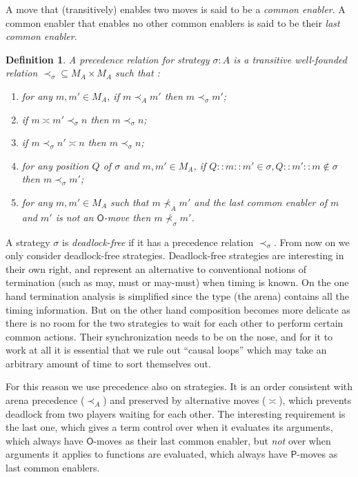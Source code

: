 \documentclass{article}
\newtheorem{definition}[theorem]{Definition}
\newcommand{\mv}[1]{\mathsf{#1}}
\begin{document}
A move that (transitively) enables two moves is said to be a \emph{common enabler}. A common enabler that enables no other common enablers is said to be their \emph{last common enabler}. 
\begin{definition}\label{def:precs}
A \emph{precedence relation for strategy} $\sigma:A$ is a transitive well-founded relation ${\prec_\sigma}\subseteq M_A\times M_A$ such that :
\begin{enumerate}
\item for any $m,m'\in M_A$, if $m\prec_A m'$ then $m\prec_\sigma m'$;
\item if $m\asymp m' \prec_\sigma n$ then $m\prec_\sigma n$;
\item if $m\prec_\sigma n'\asymp n$ then $m\prec_\sigma n$;
\item for any position $Q$ of $\sigma$ and $m,m'\in M_A$, if $Q::m::m'\in \sigma, Q::m'::m\not\in\sigma$ then $m\prec_\sigma m'$;
\item for any $m,m'\in M_A$ such that $m\not\prec_A m'$ and the last common enabler of $m$ and $m'$ is not an $\mv O$-move then $m\not\prec_\sigma m'$.
\end{enumerate}
\end{definition}
A strategy $\sigma$ is \emph{deadlock-free} if it has a precedence relation $\prec_\sigma$. From now on we only consider deadlock-free strategies. Deadlock-free strategies are interesting in their own right, and represent an alternative to conventional notions of termination (such as may, must or may-must) when timing is known. On the one hand termination analysis is simplified since the type (the arena) contains all the timing information. But on the other hand composition becomes more delicate as there is no room for the two strategies to wait for each other to perform certain common actions. Their synchronization needs to be on the nose, and for it to work at all it is essential that we rule out ``causal loops'' which may take an arbitrary amount of time to sort themselves out.  

For this reason we use precedence also on strategies. It is an order consistent with arena precedence ($\prec_A$) and preserved by alternative moves ($\asymp$), which prevents deadlock from two players waiting for each other.  The interesting requirement is the last one, which gives a term control over when it evaluates its arguments, which always have $\mv O$-moves as their last common enabler, but \emph{not} over when arguments it applies to functions are evaluated, which always have $\mv P$-moves as last common enablers. 
\end{document}

